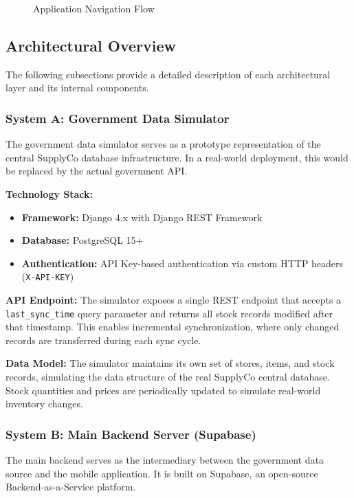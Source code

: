 \begin{figure}[H]
\begin{tikzpicture}
\end{tikzpicture}
\caption{Application Navigation Flow}
\label{fig:appflow}
\end{figure}

\subsection{Architectural Overview}

The following subsections provide a detailed description of each architectural layer and its internal components.

\subsubsection{System A: Government Data Simulator}

The government data simulator serves as a prototype representation of the central SupplyCo database infrastructure. In a real-world deployment, this would be replaced by the actual government API.

\textbf{Technology Stack:}
\begin{itemize}
    \item \textbf{Framework:} Django 4.x with Django REST Framework
    \item \textbf{Database:} PostgreSQL 15+
    \item \textbf{Authentication:} API Key-based authentication via custom HTTP headers (\texttt{X-API-KEY})
\end{itemize}

\textbf{API Endpoint:}
The simulator exposes a single REST endpoint that accepts a \newline \texttt{last\_sync\_time} query parameter and returns all stock records modified after that timestamp. This enables incremental synchronization, where only changed records are transferred during each sync cycle.

\textbf{Data Model:}
The simulator maintains its own set of stores, items, and stock records, simulating the data structure of the real SupplyCo central database. Stock quantities and prices are periodically updated to simulate real-world inventory changes.

\subsubsection{System B: Main Backend Server (Supabase)}

The main backend serves as the intermediary between the government data source and the mobile application. It is built on Supabase, an open-source Backend-as-a-Service platform.

